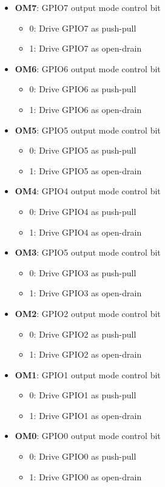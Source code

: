 \documentclass{article}
\begin{document}
	\begin{itemize}
		\item \textbf{OM7}: GPIO7 output mode control bit
		\begin{itemize}
			\item 0: Drive GPIO7 as push-pull
			\item 1: Drive GPIO7 as open-drain
		\end{itemize}
		\item \textbf{OM6}: GPIO6 output mode control bit
		\begin{itemize}
			\item 0: Drive GPIO6 as push-pull
			\item 1: Drive GPIO6 as open-drain
		\end{itemize}
		\item \textbf{OM5}: GPIO5 output mode control bit
		\begin{itemize}
			\item 0: Drive GPIO5 as push-pull
			\item 1: Drive GPIO5 as open-drain
		\end{itemize}
		\item \textbf{OM4}: GPIO4 output mode control bit
		\begin{itemize}
			\item 0: Drive GPIO4 as push-pull
			\item 1: Drive GPIO4 as open-drain
		\end{itemize}
		\item \textbf{OM3}: GPIO5 output mode control bit
		\begin{itemize}
			\item 0: Drive GPIO3 as push-pull
			\item 1: Drive GPIO3 as open-drain
		\end{itemize}
		\item \textbf{OM2}: GPIO2 output mode control bit
		\begin{itemize}
			\item 0: Drive GPIO2 as push-pull
			\item 1: Drive GPIO2 as open-drain
		\end{itemize}
		\item \textbf{OM1}: GPIO1 output mode control bit
		\begin{itemize}
			\item 0: Drive GPIO1 as push-pull
			\item 1: Drive GPIO1 as open-drain
		\end{itemize}
		\item \textbf{OM0}: GPIO0 output mode control bit
		\begin{itemize}
			\item 0: Drive GPIO0 as push-pull
			\item 1: Drive GPIO0 as open-drain
		\end{itemize}
	\end{itemize}
	
\end{document}
